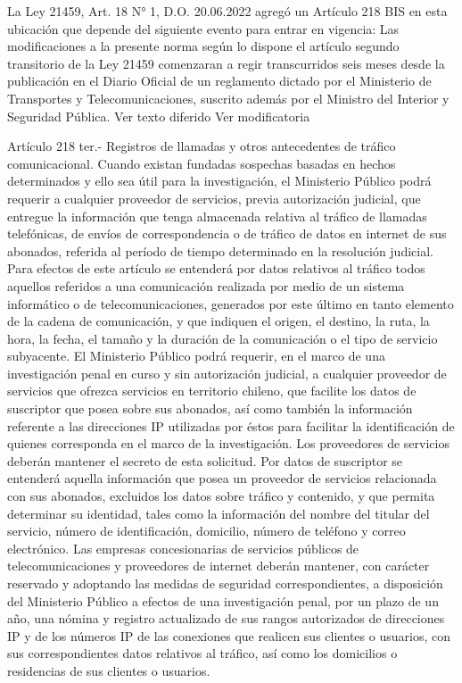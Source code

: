  La Ley 21459, Art. 18 N° 1, D.O. 20.06.2022 agregó un Artículo 218 BIS en esta ubicación que depende del siguiente evento para entrar en vigencia: Las modificaciones a la presente norma según lo dispone el artículo segundo transitorio de la Ley 21459 comenzaran a regir transcurridos seis meses desde la publicación en el Diario Oficial de un reglamento dictado por el Ministerio de Transportes y Telecomunicaciones, suscrito además por el Ministro del Interior y Seguridad Pública.
Ver texto diferido
Ver modificatoria

    Artículo 218 ter.- Registros de llamadas y otros antecedentes de tráfico comunicacional. Cuando existan fundadas sospechas basadas en hechos determinados y ello sea útil para la investigación, el Ministerio Público podrá requerir a cualquier proveedor de servicios, previa autorización judicial, que entregue la información que tenga almacenada relativa al tráfico de llamadas telefónicas, de envíos de correspondencia o de tráfico de datos en internet de sus abonados, referida al período de tiempo determinado en la resolución judicial.
    Para efectos de este artículo se entenderá por datos relativos al tráfico todos aquellos referidos a una comunicación realizada por medio de un sistema informático o de telecomunicaciones, generados por este último en tanto elemento de la cadena de comunicación, y que indiquen el origen, el destino, la ruta, la hora, la fecha, el tamaño y la duración de la comunicación o el tipo de servicio subyacente.
    El Ministerio Público podrá requerir, en el marco de una investigación penal en curso y sin autorización judicial, a cualquier proveedor de servicios que ofrezca servicios en territorio chileno, que facilite los datos de suscriptor que posea sobre sus abonados, así como también la información referente a las direcciones IP utilizadas por éstos para facilitar la identificación de quienes corresponda en el marco de la investigación. Los proveedores de servicios deberán mantener el secreto de esta solicitud.
    Por datos de suscriptor se entenderá aquella información que posea un proveedor de servicios relacionada con sus abonados, excluidos los datos sobre tráfico y contenido, y que permita determinar su identidad, tales como la información del nombre del titular del servicio, número de identificación, domicilio, número de teléfono y correo electrónico. Las empresas concesionarias de servicios públicos de telecomunicaciones y proveedores de internet deberán mantener, con carácter reservado y adoptando las medidas de seguridad correspondientes, a disposición del Ministerio Público a efectos de una investigación penal, por un plazo de un año, una nómina y registro actualizado de sus rangos autorizados de direcciones IP y de los números IP de las conexiones que realicen sus clientes o usuarios, con sus correspondientes datos relativos al tráfico, así como los domicilios o residencias de sus clientes o usuarios.

